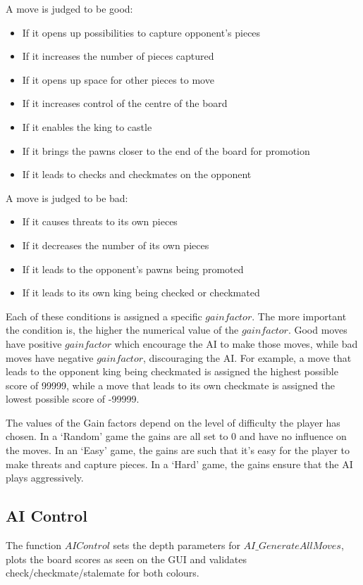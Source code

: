 \documentclass[11pt,a4paper]{article}
\begin{document}
\noindent A move is judged to be good:
\begin{itemize}
\item If it opens up possibilities to capture opponent’s pieces
\item If it increases the number of pieces captured
\item If it opens up space for other pieces to move
\item If it increases control of the centre of the board
\item If it enables the king to castle
\item If it brings the pawns closer to the end of the board for promotion
\item If it leads to checks and checkmates on the opponent
\end{itemize}

\noindent A move is judged to be bad:
\begin{itemize}
\item If it causes threats to its own pieces
\item If it decreases the number of its own pieces
\item If it leads to the opponent’s pawns being promoted
\item If it leads to its own king being checked or checkmated
\end{itemize}

Each of these conditions is assigned a specific $gainfactor$. The more important the condition is, the higher the numerical value of the $gainfactor$. Good moves have positive $gainfactor$ which encourage the AI to make those moves, while bad moves have negative $gainfactor$, discouraging the AI.
\newline
For example, a move that leads to the opponent king being checkmated is assigned the highest possible score of 99999, while a move that leads to its own checkmate is assigned the lowest possible score of -99999.

The values of the Gain factors depend on the level of difficulty the player has chosen. In a ‘Random’ game the gains are all set to 0 and have no influence on the moves. In an ‘Easy’ game, the gains are such that it’s easy for the player to make threats and capture pieces. In a ‘Hard’ game, the gains ensure that the AI plays aggressively. 


\subsection{AI Control}
\indent\indent The function $AIControl$ sets the depth parameters for $AI\_GenerateAllMoves$, plots the board scores as seen on the GUI and validates check/checkmate/stalemate for both colours.
\end{document}
